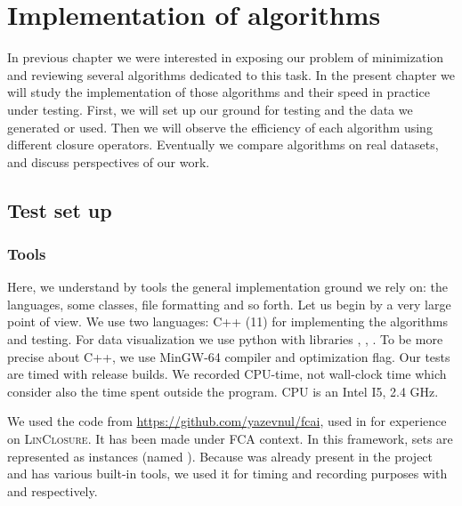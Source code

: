 \chapter{Implementation of algorithms}

In previous chapter we were interested in exposing our problem of minimization
and reviewing several algorithms dedicated to this task. In the present chapter we will study the implementation of those algorithms and their speed in practice
under testing. First, we will set up our ground for testing and the data we generated or used. Then we will observe the efficiency of each algorithm using 
different closure operators. Eventually we compare algorithms on real datasets,
and discuss perspectives of our work.

\section{Test set up}

\subsection{Tools}

Here, we understand by tools the general implementation ground we rely on:
the languages, some classes, file formatting and so forth. Let us begin by
a very large point of view. We use two languages: C++ (11) for implementing
the algorithms and testing. For data visualization we use python with libraries , , . To be more precise about C++, 
we use MinGW-64 compiler and  optimization flag. Our tests are timed
with release builds. We recorded CPU-time, not wall-clock time which consider also the time spent outside the program. CPU is an Intel I5, 2.4 GHz.

\vspace{1.2em}

We used the code from \url{https://github.com/yazevnul/fcai}, used in 
\cite{bazhanov_optimizations_2014} for experience on \textsc{LinClosure}. It has been made under FCA context. In this framework, sets are represented as  instances (named ). Because 
was already present in the project and has various built-in tools, we used it
for timing and recording purposes with  and  respectively.

\vspace{1.2em}

